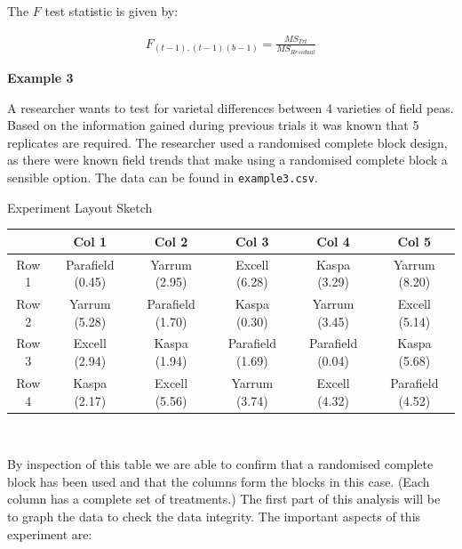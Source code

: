 \documentclass[a4paper, 10pt, fleqn, twosided]{memoir}
\begin{document}
The $F$ test statistic is given by:

\begin{eqnarray*}
F_{(t-1),(t-1)(b-1)} = \frac{MS_{Trt}}{MS_{Residual}}
\end{eqnarray*}


\clearpage
\textbf{Example 3}

A researcher wants to test for varietal differences between 4 varieties of field peas. Based on the information gained
during previous trials it was known that 5 replicates are required. The researcher used a randomised complete block
design, as there were known field trends that make using a randomised complete block a sensible option. The data can be
found in  \texttt{example3.csv}.


\begin{application}{Experiment Layout Sketch}
\vspace{10cm}
\end{application}


\begin{center}
\begin{tabular}{|c|c|c|c|c|c|}
  \hline
   & Col 1 & Col 2 & Col 3 & Col 4 & Col 5 \\
  \hline
  Row 1 & Parafield (0.45) & Yarrum (2.95) & Excell (6.28) & Kaspa (3.29) & Yarrum (8.20) \\
  \hline
  Row 2 & Yarrum (5.28) & Parafield (1.70) & Kaspa (0.30) & Yarrum (3.45) & Excell (5.14) \\
  \hline
  Row 3 & Excell (2.94) & Kaspa (1.94) & Parafield (1.69) & Parafield (0.04) & Kaspa (5.68) \\
  \hline
  Row 4 & Kaspa (2.17) & Excell (5.56) & Yarrum (3.74) & Excell (4.32) & Parafield (4.52) \\
  \hline
\end{tabular} \\
\end{center}
By inspection of this table we are able to confirm that a randomised complete block has been used and that the columns
form the blocks in this case. (Each column has a complete set of treatments.) The first part of this analysis will be
to graph the data to check the data integrity. The important aspects of this experiment are:
\end{document}
